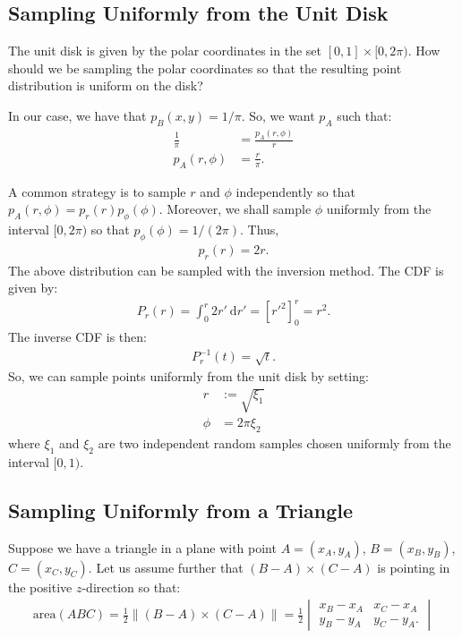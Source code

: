 \documentclass[10pt]{article}
\newcommand{\dee}{\mathrm{d}}
\begin{document}
  \subsection{Sampling Uniformly from the Unit Disk}

  The unit disk is given by the polar coordinates in the set $[0,1] \times [0,2\pi)$.  How should we be sampling the polar coordinates so that the resulting point distribution is uniform on the disk?

  In our case, we have that $p_B(x,y) = 1/\pi$.  So, we want $p_A$ such that:
  \begin{align*}
    \frac{1}{\pi} &= \frac{p_A(r,\phi)}{r} \\
    p_A(r,\phi) &= \frac{r}{\pi}.
  \end{align*}

  A common strategy is to sample $r$ and $\phi$ independently so that $p_A(r,\phi) = p_r(r) p_\phi(\phi)$.  Moreover, we shall sample $\phi$ uniformly from the interval $[0,2\pi)$ so that $p_\phi(\phi) = 1/(2\pi)$.  Thus,
  \begin{align*}
    p_r(r) = 2r.
  \end{align*}
  The above distribution can be sampled with the inversion method.  The CDF is given by:
  \begin{align*}
    P_r(r) = \int_0^{r} 2r'\ \dee r' = [r'^2]_0^{r} = r^2.
  \end{align*}
  The inverse CDF is then:
  \begin{align*}
    P_r^{-1}(t) = \sqrt{t}.
  \end{align*}
  So, we can sample points uniformly from the unit disk by setting:
  \begin{align*}
    r &:= \sqrt{\xi_1} \\
    \phi &= 2\pi\xi_2
  \end{align*}
  where $\xi_1$ and $\xi_2$ are two independent random samples chosen uniformly from the interval $[0,1)$.

  \subsection{Sampling Uniformly from a Triangle}

  Suppose we have a triangle in a plane with point $A = (x_A, y_A)$, $B = (x_B, y_B)$, $C = (x_C, y_C)$.  Let us assume further that $(B-A) \times (C-A)$ is pointing in the positive $z$-direction so that:
  \begin{align*}
     \mathrm{area}(ABC) = \frac{1}{2} \| (B-A) \times (C-A) \| = \frac{1}{2} \begin{vmatrix}
       x_B - x_A & x_C - x_A \\
       y_B - y_A & y_C - y_A.
     \end{vmatrix}
  \end{align*}
\end{document}
